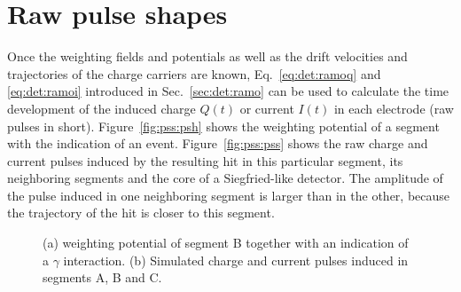 \section{Raw pulse shapes} 
\label{sec:pss:ps} 
Once the weighting fields and potentials as well as the drift
velocities and trajectories of the charge carriers are known,
Eq.~\ref{eq:det:ramoq} and \ref{eq:det:ramoi} introduced in
Sec.~\ref{sec:det:ramo} can be used to calculate the time development
of the induced charge $Q(t)$ or current $I(t)$ in each electrode (raw
pulses in short).  Figure~\ref{fig:pss:psh} shows the weighting
potential of a segment with the indication of an event.
Figure~\ref{fig:pss:pss} shows the raw charge and current pulses
induced by the resulting hit in this particular segment, its
neighboring segments and the core of a Siegfried-like detector.  The
amplitude of the pulse induced in one neighboring segment is larger
than in the other, because the trajectory of the hit is closer to this
segment.
\begin{figure}[htbp] 
\centering 
{}%
% 
\caption{(a) weighting potential of segment B together with an
indication of a $\gamma$ interaction. (b) Simulated charge and current
pulses induced in segments A, B and C.}
\label{fig:pss:ps} 
\end{figure} 
 
